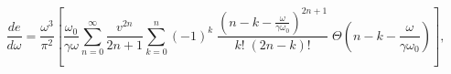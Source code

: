 \begin{equation} 
\label{ksy6} 
\frac{de}{d\omega}= 
\frac{\omega ^3}{\pi ^2} 
\left[ 
\frac{\omega _{0}}{\gamma\omega} 
\sum _{n=0}^{\infty} 
\frac{v^{2n}}{2n+1}\sum _{k=0}^{n}(-1)^{k} 
\; 
\frac{(n-k-\frac{\omega}{\gamma \omega _0})^{2n+1}}{k!\; (2n-k)!} 
\; 
\Theta\left(n-k-\frac{\omega}{\gamma \omega _0}\right)\right], 
\end{equation} 
